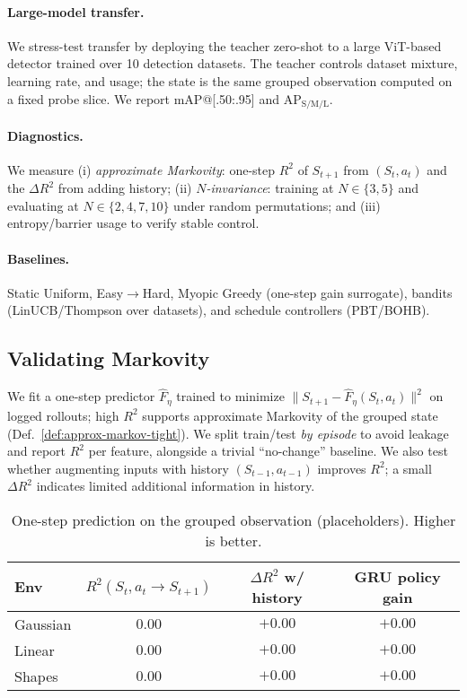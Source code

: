 \documentclass[11pt]{article}
\newcommand{\1}{\mathbf{1}}
\begin{document}
\paragraph{Large-model transfer.}
We stress-test transfer by deploying the teacher zero-shot to a large ViT-based detector trained over 10 detection datasets. 
The teacher controls dataset mixture, learning rate, and usage; the state is the same grouped observation computed on a fixed probe slice.
We report mAP@[.50:.95] and AP$_\mathrm{S/M/L}$.

\paragraph{Diagnostics.}
We measure (i) \emph{approximate Markovity}: one-step $R^2$ of $S_{t+1}$ from $(S_t,a_t)$ and the $\Delta R^2$ from adding history; (ii) \emph{$N$-invariance}: training at $N\in\{3,5\}$ and evaluating at $N\in\{2,4,7,10\}$ under random permutations; and (iii) entropy/barrier usage to verify stable control.

\paragraph{Baselines.}
Static Uniform, Easy$\to$Hard, Myopic Greedy (one-step gain surrogate), bandits (LinUCB/Thompson over datasets), and schedule controllers (PBT/BOHB).

\subsection{Validating Markovity}\label{sec:markov-exp}
We fit a one-step predictor $\hat{F}_\eta$ trained to minimize $\|S_{t+1}-\hat{F}_\eta(S_t,a_t)\|^2$ on logged rollouts; high $R^2$ supports approximate Markovity of the grouped state (Def.~\ref{def:approx-markov-tight}).
We split train/test \emph{by episode} to avoid leakage and report $R^2$ per feature, alongside a trivial ``no-change'' baseline.
We also test whether augmenting inputs with history $(S_{t-1},a_{t-1})$ improves $R^2$; a small $\Delta R^2$ indicates limited additional information in history.
\begin{table}[H]
\centering
\caption{One-step prediction on the grouped observation (placeholders). Higher is better.}
\label{tab:markov}
\begin{tabular}{lccc}
\toprule
Env & $R^2(S_t,a_t\!\to\!S_{t+1})$ & $\Delta R^2$ w/ history & GRU policy gain \\
\midrule
Gaussian & $0.00$ & $+0.00$ & $+0.00$ \\
Linear & $0.00$ & $+0.00$ & $+0.00$ \\
Shapes & $0.00$ & $+0.00$ & $+0.00$ \\
\bottomrule
\end{tabular}
\end{table}
\end{document}
